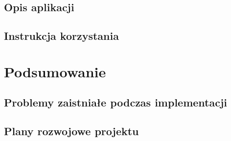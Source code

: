 \documentclass[eng,printmode]{mgr}
\begin{document}
\section{Opis aplikacji}
\section{Instrukcja korzystania}
\chapter{Podsumowanie}
\section{Problemy zaistniałe podczas implementacji}
\section{Plany rozwojowe projektu}

\end{document}
